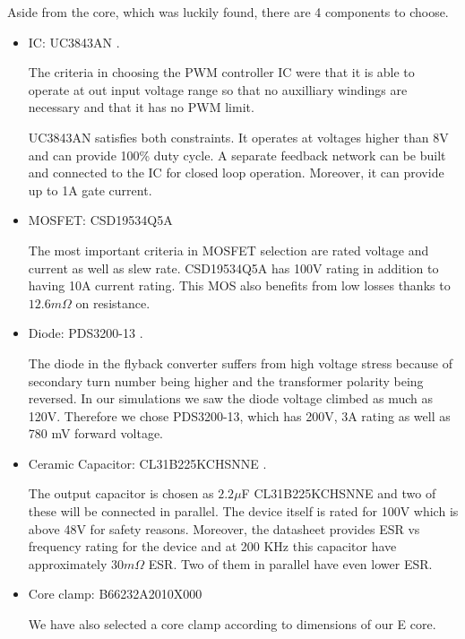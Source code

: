 \documentclass[12pt]{article}
\begin{document}
    Aside from the core, which was luckily found, there are 4 components to choose.
\begin{itemize}
    \item IC: UC3843AN \cite{ic}. 

    The criteria in choosing the PWM controller IC were that it is able to operate at out input voltage range so that no auxilliary windings are necessary and that it has no PWM limit. 

    UC3843AN satisfies both constraints. It operates at voltages higher than 8V and can provide 100\% duty cycle. A separate feedback network can be built and connected to the IC for closed loop operation. Moreover, it can provide up to 1A gate current. 

    \item MOSFET: CSD19534Q5A \cite{mos}

    The most important criteria in MOSFET selection are rated voltage and current as well as slew rate. CSD19534Q5A has 100V rating in addition to having 10A current rating. This MOS also benefits from low losses thanks to $12.6 m\Omega$ on resistance.  

    \item Diode: PDS3200-13 \cite{diode}.

    The diode in the flyback converter suffers from high voltage stress because of secondary turn number being higher and the transformer polarity being reversed. In our simulations we saw the diode voltage climbed as much as 120V. Therefore we chose PDS3200-13, which has 200V, 3A rating as well as 780 mV forward voltage.

    \item Ceramic Capacitor: CL31B225KCHSNNE \cite{cap}.

    The output capacitor is chosen as $2.2\mu$F CL31B225KCHSNNE and two of these will be connected in parallel. The device itself is rated for 100V which is above 48V for safety reasons. Moreover,  the datasheet provides ESR vs frequency rating for the device and at 200 KHz this capacitor have approximately $30m\Omega$ ESR. Two of them in parallel have even lower ESR.

    \item Core clamp: B66232A2010X000 \cite{clamp}
    
    We have also selected a core clamp according to dimensions of our E core. 

\end{itemize}
\end{document}
